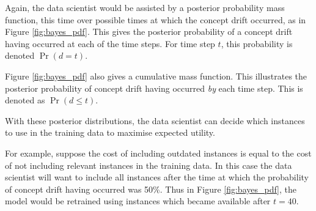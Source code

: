\begin{displayquote}
    Again, the data scientist would be assisted by a posterior probability mass function, this time over possible times at which the concept drift occurred, as in Figure \ref{fig:bayes_pdf}. This gives the posterior probability of a concept drift having occurred at each of the time steps. For time step $t$, this probability is denoted $\Pr(d=t)$. 
    
    Figure \ref{fig:bayes_pdf} also gives a cumulative mass function. This illustrates the posterior probability of concept drift having occurred {\it by} each time step. This is denoted as $\Pr(d\le t)$. 
    
    With these posterior distributions, the data scientist can decide which instances to use in the training data to maximise expected utility. 
    
    For example, suppose the cost of including outdated instances is equal to the cost of not including relevant instances in the training data. In this case the data scientist will want to include all instances after the time at which the probability of concept drift having occurred was 50\%. Thus in Figure \ref{fig:bayes_pdf}, the model would be retrained using instances which became available after $t=40$.
\end{displayquote}

\newcommand*\GnuplotDefs{
    set samples 123;
    Binv(p,q)=exp(lgamma(p+q)-lgamma(p)-lgamma(q));
    beta(x,p,q)=p<=0||q<=0?1/0:x<0||x>1?0.0:Binv(p,q)*x**(p-1.0)*(1.0-x)**(q-1.0);
}

\newcommand{\bwafFig}[8]{
    \begin{tikzpicture}
        \pgfmathsetmacro{\xmin}{0}
        \pgfmathsetmacro{\xmax}{1}
        \begin{axis}[
            xmin=\xmin,
            xmax=\xmax,
            ymin=-0.01,
            ymax=11,
            xlabel=Error rate $q$,
            ylabel=$\Pr(q)$,
            axis line style={->},
            no markers,
        ]
            \addplot gnuplot [raw gnuplot] {
                \GnuplotDefs
                plot [x=\xmin:\xmax] beta(x,#1,#2);
            };
            \addplot gnuplot [raw gnuplot] {
                \GnuplotDefs
                plot [x=\xmin:\xmax] beta(x,#3,#4);
            };
            \node [color=blue, right] at (#5,#6) {Anterograde};
            \node [color=red, right] at (#7,#8) {Retrograde};
        \end{axis}
    \end{tikzpicture}
}

